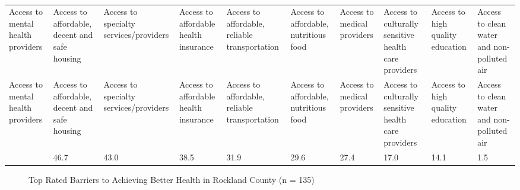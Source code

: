 \documentclass[
  english,
  letterpaper,
]{report}
\begin{document}
\begin{longtable}[]{@{}llllllllll@{}}

\caption{\label{tbl-rc-affect-health}Top Rated Issues That Affect Health
in Rockland County (n = 135)}

\tabularnewline

\caption{}\label{T_c4045}\tabularnewline
\toprule\noalign{}
Access to mental health providers & Access to affordable, decent and
safe housing & Access to specialty services/providers & Access to
affordable health insurance & Access to affordable, reliable
transportation & Access to affordable, nutritious food & Access to
medical providers & Access to culturally sensitive health care providers
& Access to high quality education & Access to clean water and
non-polluted air \\
\midrule\noalign{}
\endfirsthead
\toprule\noalign{}
Access to mental health providers & Access to affordable, decent and
safe housing & Access to specialty services/providers & Access to
affordable health insurance & Access to affordable, reliable
transportation & Access to affordable, nutritious food & Access to
medical providers & Access to culturally sensitive health care providers
& Access to high quality education & Access to clean water and
non-polluted air \\
\midrule\noalign{}
\endhead
\bottomrule\noalign{}
\endlastfoot
50.4 & 46.7 & 43.0 & 38.5 & 31.9 & 29.6 & 27.4 & 17.0 & 14.1 & 1.5 \\

\end{longtable}

\begin{figure}


\caption{\label{fig-rc-achieve-health}Top Rated Barriers to Achieving
Better Health in Rockland County (n = 135)}

\end{figure}%
\end{document}
